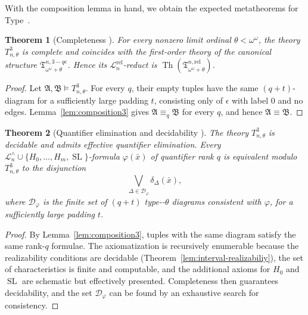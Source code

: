 \documentclass{amsart}
\newtheorem{theorem}{Theorem}
\theoremstyle{definition}
\begin{document}
With the composition lemma in hand, we obtain the expected metatheorems for Type~{\MakeUppercase{}}.

\begin{theorem}[Completeness \MakeUppercase{}]\label{thm:tree-completeness3}
    For every nonzero limit ordinal $\theta<\omega^\omega$, the theory $T_{n,\theta}^3$ is complete and coincides with the first‑order theory of the canonical structure $\mathfrak T_{\omega^\omega+\theta}^{n,3-qe}$. Hence its $\mathcal L_n^{\mathrm{rel}}$-reduct is $\operatorname{Th}(\mathfrak T_{\omega^\omega+\theta}^{n,\mathrm{rel}})$.
\end{theorem}
\begin{proof}
    Let $\mathfrak A,\mathfrak B\models T_{n,\theta}^3$. For every $q$, their empty tuples have the same $(q+t)$-diagram for a sufficiently large padding $t$, consisting only of $\epsilon$ with label $0$ and no edges. Lemma~\ref{lem:composition3} gives $\mathfrak A\equiv_q\mathfrak B$ for every $q$, and hence $\mathfrak A\equiv\mathfrak B$.
\end{proof}

\begin{theorem}[Quantifier elimination and decidability \MakeUppercase{}]\label{thm:3-qe}
    The theory $T_{n,\theta}^3$ is decidable and admits effective quantifier elimination. Every $\mathcal L_n^\wedge\cup\{H_0,\dots,H_m,\operatorname{SL}\}$-formula $\varphi(\bar x)$ of quantifier rank $q$ is equivalent modulo $T_{n,\theta}^3$ to the disjunction
    $$\bigvee_{\Delta\in\mathcal D_\varphi}\delta_\Delta(\bar x),$$
    where $\mathcal D_\varphi$ is the finite set of $(q+t)$ type-\MakeUppercase{}-$\theta$ diagrams consistent with $\varphi$, for a sufficiently large padding $t$.
\end{theorem}
\begin{proof}
    By Lemma~\ref{lem:composition3}, tuples with the same diagram satisfy the same rank-$q$ formulae. The axiomatization is recursively enumerable because the realizability conditions are decidable (Theorem~\ref{lem:interval-realizabiliy}), the set of characteristics is finite and computable, and the additional axioms for $H_0$ and $\operatorname{SL}$ are schematic but effectively presented. Completeness then guarantees decidability, and the set $\mathcal D_\varphi$ can be found by an exhaustive search for consistency.
\end{proof}
\end{document}
